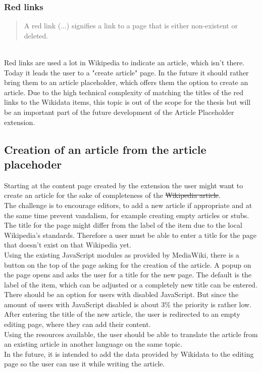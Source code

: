 \documentclass[11pt]{article}
\begin{document}
\subsubsection{Red links}
\begin{quotation}
A red link (...) signifies a link to a page that is either non-existent or deleted. 
\end{quotation} \cite{wiki:01} %
\\
Red links are used a lot in Wikipedia to indicate an article, which isn't there. Today it leads the user to a "create article" page. In the future it should rather bring them to an article placeholder, which offers them the option to create an article. Due to the high technical complexity of matching the titles of the red links to the Wikidata items, this topic is out of the scope for the thesis but will be an important part of the future development of the Article Placeholder extension.

\subsection{Creation of an article from the article placehoder}
Starting at the content page created by the extension the user might want to create an article for the sake of completeness of the \st{Wikipedia article}. \\
The challenge is to encourage editors, to add a new article if appropriate and at the same time prevent vandalism, for example creating empty articles or stubs.\\ 
 The title for the page might differ from the label of the item due to the local Wikipedia's standards. Therefore a user must be able to enter a title for the page that doesn't exist on that Wikipedia yet. \\
Using the existing JavaScript modules as provided by MediaWiki, there is a button on the top of the page asking for the creation of the article. A popup on the page opens and asks the user for a title for the new page. The default is the label of the item, which can be adjusted or a completely new title can be entered. \\
There should be an option for users with disabled JavaScript. But since the amount of users with JavaScript disabled is about 3\% %
the priority is rather low. \\
After entering the title of the new article, the user is redirected to an empty editing page, where they can add their content. \\
Using the resources available, the user should be able to translate the article from an existing article in another language on the same topic. \\
In the future, it is intended to add the data provided by Wikidata to the editing page so the user can use it while writing the article. 
\end{document}
